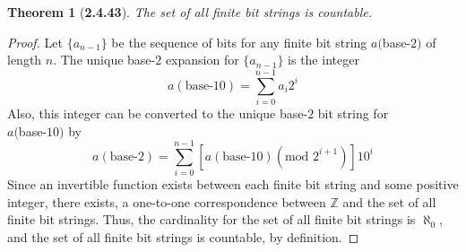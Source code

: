 \documentclass[a4paper, 12pt]{article}
\theoremstyle{plain}
\newtheorem*{theorem*}{Theorem}
\begin{document}
\pagebreak


\begin{theorem*}[\textbf{2.4.43}]
    The set of all finite bit strings is countable.
\end{theorem*}

\begin{proof}
    Let $\{a_{n-1}\}$ be the sequence of bits for any finite bit string $a($base-$2)$ of length $n$. 
    The unique base-$2$ expansion for $\{a_{n-1}\}$ is the integer
    $$a(\text{base-}10) = \sum_{i = 0}^{n-1} a_{i}2^{i}$$
    Also, this integer can be converted to the unique base-$2$ bit string for \\ $a($base-$10)$ by 
    $$a(\text{base-}2) = 
    \sum_{i = 0}^{n-1}\left[a(\text{base-}10)(\text{mod } 2^{i+1})\right]10^{i}$$ 
    Since an invertible function exists between each finite bit string and some positive integer, 
    there exists, a one-to-one correspondence between $\mathbb{Z}$ and the set of all 
    finite bit strings. Thus, the cardinality for the set of all finite bit strings is $\aleph_0$,
    and the set of all finite bit strings is countable, by definition.
\end{proof}
\end{document}
